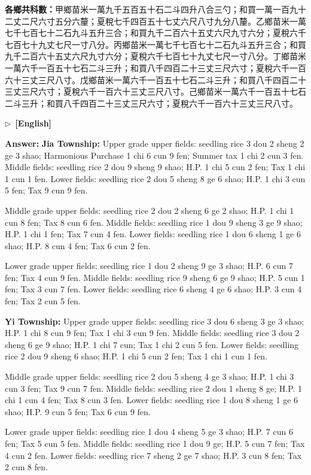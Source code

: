 \documentclass[10pt,a4paper]{article}
\newcommand{\ENmarker}{\noindent\textcolor{enlabel}{$\triangleright$\ \textbf{[English]}}\par}
\newcommand{\AnswerEn}[1]{\par\noindent\textbf{\color{answercolor}Answer:} #1\par}
\begin{document}
{\textbf{各鄉共科數：}甲鄉苗米一萬九千五百五十石二斗四升八合三勺；和買一萬一百九十二丈二尺六寸五分六釐；夏稅七千四百五十七丈六尺八寸九分八釐。乙鄉苗米一萬七千七百七十二石九斗五升三合；和買九千二百六十五丈六尺九寸六分；夏稅六千七百七十九丈七尺一寸八分。丙鄉苗米一萬七千七百七十二石九斗五升三合；和買九千二百六十五丈六尺九寸六分；夏稅六千七百七十九丈七尺一寸八分。丁鄉苗米一萬六千一百五十七石二斗三升；和買八千四百二十三丈三尺六寸；夏稅六千一百六十三丈三尺八寸。戊鄉苗米一萬六千一百五十七石二斗三升；和買八千四百二十三丈三尺六寸；夏稅六千一百六十三丈三尺八寸。己鄉苗米一萬六千一百五十七石二斗三升；和買八千四百二十三丈三尺六寸；夏稅六千一百六十三丈三尺八寸。}

\ENmarker
\AnswerEn{\textbf{Jia Township:} Upper grade upper fields: seedling rice 3 dou 2 sheng 2 ge 3 shao; Harmonious Purchase 1 chi 6 cun 9 fen; Summer tax 1 chi 2 cun 3 fen. Middle fields: seedling rice 2 dou 9 sheng 9 shao; H.P. 1 chi 5 cun 2 fen; Tax 1 chi 1 cun 1 fen. Lower fields: seedling rice 2 dou 5 sheng 8 ge 6 shao; H.P. 1 chi 3 cun 5 fen; Tax 9 cun 9 fen.

Middle grade upper fields: seedling rice 2 dou 2 sheng 6 ge 2 shao; H.P. 1 chi 1 cun 8 fen; Tax 8 cun 6 fen. Middle fields: seedling rice 1 dou 9 sheng 3 ge 9 shao; H.P. 1 chi 1 fen; Tax 7 cun 4 fen. Lower fields: seedling rice 1 dou 6 sheng 1 ge 6 shao; H.P. 8 cun 4 fen; Tax 6 cun 2 fen.

Lower grade upper fields: seedling rice 1 dou 2 sheng 9 ge 3 shao; H.P. 6 cun 7 fen; Tax 4 cun 9 fen. Middle fields: seedling rice 9 sheng 6 ge 9 shao; H.P. 5 cun 1 fen; Tax 3 cun 7 fen. Lower fields: seedling rice 6 sheng 4 ge 6 shao; H.P. 3 cun 4 fen; Tax 2 cun 5 fen.

\textbf{Yi Township:} Upper grade upper fields: seedling rice 3 dou 6 sheng 3 ge 3 shao; H.P. 1 chi 8 cun 9 fen; Tax 1 chi 3 cun 9 fen. Middle fields: seedling rice 3 dou 2 sheng 6 ge 9 shao; H.P. 1 chi 7 cun; Tax 1 chi 2 cun 5 fen. Lower fields: seedling rice 2 dou 9 sheng 6 shao; H.P. 1 chi 5 cun 2 fen; Tax 1 chi 1 cun 1 fen.

Middle grade upper fields: seedling rice 2 dou 5 sheng 4 ge 3 shao; H.P. 1 chi 3 cun 3 fen; Tax 9 cun 7 fen. Middle fields: seedling rice 2 dou 1 sheng 8 ge; H.P. 1 chi 1 cun 4 fen; Tax 8 cun 3 fen. Lower fields: seedling rice 1 dou 8 sheng 1 ge 6 shao; H.P. 9 cun 5 fen; Tax 6 cun 9 fen.

Lower grade upper fields: seedling rice 1 dou 4 sheng 5 ge 3 shao; H.P. 7 cun 6 fen; Tax 5 cun 5 fen. Middle fields: seedling rice 1 dou 9 ge; H.P. 5 cun 7 fen; Tax 4 cun 2 fen. Lower fields: seedling rice 7 sheng 2 ge 7 shao; H.P. 3 cun 8 fen; Tax 2 cun 8 fen.

}
\end{document}
